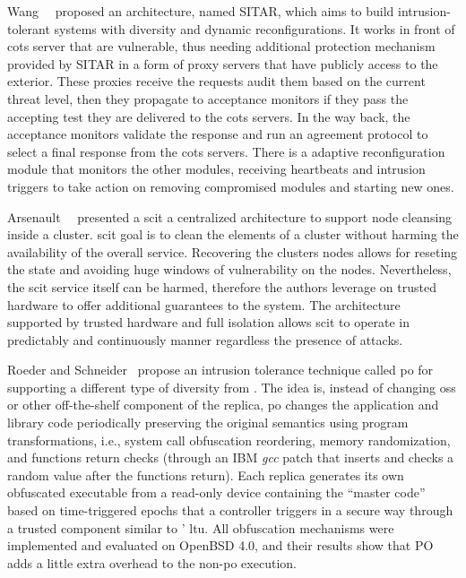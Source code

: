 Wang~\etal{}~\cite{Wang:2003} proposed an architecture, named \textsc{SITAR}, which aims to build intrusion-tolerant systems with diversity and dynamic reconfigurations.
It works in front of \gls{cots} server that are vulnerable, thus needing additional protection mechanism provided by \textsc{SITAR} in a form of proxy servers that have publicly access to the exterior.
These proxies receive the requests audit them based on the current threat level, then they propagate to acceptance monitors if they pass the accepting test they are delivered to the \gls{cots} servers. 
In the way back, the acceptance monitors validate the response and run an agreement protocol to select a final response from the \gls{cots} servers.
There is a adaptive reconfiguration module that monitors the other modules, receiving heartbeats and intrusion triggers to take action on removing compromised modules and starting new ones.


Arsenault~\etal{}~\cite{Arsenault:2007} presented a \gls{scit} a centralized architecture to support node cleansing inside a cluster.
\gls{scit} goal is to clean the elements of a cluster without harming the availability of the overall service.
Recovering the clusters nodes allows for reseting the state and avoiding huge windows of vulnerability on the nodes.
Nevertheless, the \gls{scit} service itself can be harmed, therefore the authors leverage on trusted hardware to offer additional guarantees to the system.
The architecture supported by trusted hardware and full isolation allows \gls{scit} to operate in predictably and continuously manner regardless the presence of attacks.


Roeder and Schneider~\cite{Roeder:2010} propose an intrusion tolerance technique called \gls{po} for supporting a different type of diversity from \system.
The idea is, instead of changing \glspl{os} or other off-the-shelf component of the replica, \gls{po} changes the application and library code periodically preserving the original semantics using program transformations, i.e., system call obfuscation reordering, memory randomization, and functions return checks (through an IBM \textit{gcc} patch that inserts and checks a random value after the functions return).
Each replica generates its own obfuscated executable from a read-only device containing the ``master code'' based on time-triggered epochs that a controller triggers in a secure way through a trusted component similar to \system' \gls{ltu}.
All obfuscation mechanisms were implemented and evaluated on OpenBSD 4.0, and their results show that PO adds a little extra overhead to the non-\gls{po} execution.

